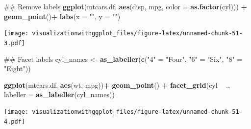 \documentclass[]{krantz}
\makeatletter
\newenvironment{Shaded}{\begin{snugshade}}{\end{snugshade}}
\newcommand{\KeywordTok}[1]{\textcolor[rgb]{0.13,0.29,0.53}{\textbf{#1}}}
\newcommand{\DataTypeTok}[1]{\textcolor[rgb]{0.13,0.29,0.53}{#1}}
\newcommand{\StringTok}[1]{\textcolor[rgb]{0.31,0.60,0.02}{#1}}
\newcommand{\OperatorTok}[1]{\textcolor[rgb]{0.81,0.36,0.00}{\textbf{#1}}}
\newcommand{\NormalTok}[1]{#1}
\newenvironment{kframe}{%
\medskip{}
\setlength{\fboxsep}{.8em}
 \def\at@end@of@kframe{}%
 \ifinner\ifhmode%
  \def\at@end@of@kframe{\end{minipage}}%
  \begin{minipage}{\columnwidth}%
 \fi\fi%
 \def\FrameCommand##1{\hskip\@totalleftmargin \hskip-\fboxsep
 \colorbox{shadecolor}{##1}\hskip-\fboxsep
     \hskip-\linewidth \hskip-\@totalleftmargin \hskip\columnwidth}%
 \MakeFramed {\advance\hsize-\width
   \@totalleftmargin\z@ \linewidth\hsize
   \@setminipage}}%
 {\par\unskip\endMakeFramed%
 \at@end@of@kframe}
\renewenvironment{Shaded}{\begin{kframe}}{\end{kframe}}
\theoremstyle{definition}
\theoremstyle{definition}
\theoremstyle{definition}
\theoremstyle{remark}
\makeatother
\begin{document}
\begin{Shaded}
\begin{Highlighting}[]
\NormalTok{## Remove labels }
\KeywordTok{ggplot}\NormalTok{(mtcars.df, }\KeywordTok{aes}\NormalTok{(disp,  mpg, }\DataTypeTok{color =} \KeywordTok{as.factor}\NormalTok{(cyl))) }\OperatorTok{+}\StringTok{ }
\StringTok{  }\KeywordTok{geom_point}\NormalTok{()}\OperatorTok{+}
\StringTok{  }\KeywordTok{labs}\NormalTok{(}\DataTypeTok{x =} \StringTok{""}\NormalTok{, }\DataTypeTok{y =} \StringTok{""}\NormalTok{)}
\end{Highlighting}
\end{Shaded}

\texttt{[image: visualizationwithggplot\_files/figure-latex/unnamed-chunk-51-3.pdf]}

\begin{Shaded}
\begin{Highlighting}[]
\NormalTok{## Facet labels }
\NormalTok{cyl_names <-}\StringTok{ }\KeywordTok{as_labeller}\NormalTok{(}\KeywordTok{c}\NormalTok{(}\StringTok{"4"}\NormalTok{ =}\StringTok{ "Four"}\NormalTok{, }\StringTok{"6"}\NormalTok{ =}\StringTok{ "Six"}\NormalTok{, }\StringTok{"8"}\NormalTok{ =}\StringTok{ "Eight"}\NormalTok{))}

 \KeywordTok{ggplot}\NormalTok{(mtcars.df, }\KeywordTok{aes}\NormalTok{(wt, mpg))}\OperatorTok{+}\StringTok{ }
\StringTok{   }\KeywordTok{geom_point}\NormalTok{() }\OperatorTok{+}
\StringTok{   }\KeywordTok{facet_grid}\NormalTok{(cyl }\OperatorTok{~}\StringTok{ }\NormalTok{., }\DataTypeTok{labeller =} \KeywordTok{as_labeller}\NormalTok{(cyl_names))}
\end{Highlighting}
\end{Shaded}

\texttt{[image: visualizationwithggplot\_files/figure-latex/unnamed-chunk-51-4.pdf]}
\end{document}
